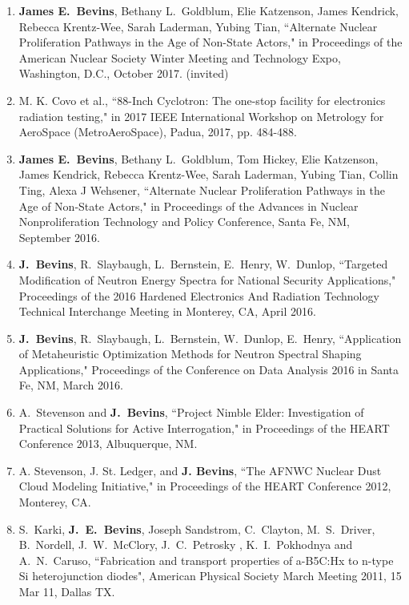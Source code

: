 \begin{enumerate}
  \item \textbf{James E.\ Bevins}, Bethany L.\ Goldblum, Elie Katzenson, James Kendrick, Rebecca Krentz-Wee, Sarah Laderman, Yubing Tian, ``Alternate Nuclear Proliferation Pathways in the Age of Non-State Actors," in Proceedings of the American Nuclear Society Winter Meeting and Technology Expo, Washington, D.C., October 2017. (invited)
  
  \item M. K. Covo et al., ``88-Inch Cyclotron: The one-stop facility for electronics radiation testing," in 2017 IEEE International Workshop on Metrology for AeroSpace (MetroAeroSpace), Padua, 2017, pp. 484-488.

  \item \textbf{James E.\ Bevins}, Bethany L.\ Goldblum, Tom Hickey, Elie Katzenson, James Kendrick, Rebecca Krentz-Wee, Sarah Laderman, Yubing Tian, Collin Ting, Alexa J Wehsener, ``Alternate Nuclear Proliferation Pathways in the Age of Non-State Actors," in Proceedings of the Advances in Nuclear Nonproliferation Technology and Policy Conference, Santa Fe, NM, September 2016.

  \item \textbf{J.\ Bevins}, R.\ Slaybaugh, L.\ Bernstein, E.\ Henry, W.\ Dunlop, ``Targeted Modification of Neutron Energy Spectra for National Security Applications," Proceedings of the 2016 Hardened Electronics And Radiation Technology Technical Interchange Meeting in Monterey, CA, April 2016. 

  \item \textbf{J.\ Bevins}, R.\ Slaybaugh, L.\ Bernstein, W.\ Dunlop, E.\ Henry, ``Application of Metaheuristic Optimization Methods for Neutron Spectral Shaping Applications," Proceedings of the Conference on Data Analysis 2016 in Santa Fe, NM, March 2016.
  
  \item A.\ Stevenson and \textbf{J.\ Bevins}, ``Project Nimble Elder: Investigation of Practical Solutions for Active Interrogation," in Proceedings of the HEART Conference 2013, Albuquerque, NM.
  
  \item A. Stevenson, J. St. Ledger, and \textbf{J. Bevins}, ``The AFNWC Nuclear Dust Cloud Modeling Initiative," in Proceedings of the HEART Conference 2012, Monterey, CA.

  \item S.\ Karki, \textbf{J.\ E.\ Bevins}, Joseph Sandstrom, C.\ Clayton, M.\ S.\ Driver, B.\ Nordell, J.\ W.\ McClory, J.\ C.\ Petrosky , K.\ I.\ Pokhodnya and A.\ N.\ Caruso, ``Fabrication and transport properties of a-B5C:Hx to n-type Si heterojunction diodes", American Physical Society March Meeting 2011, 15 Mar 11, Dallas TX. 
  

\end{enumerate}

